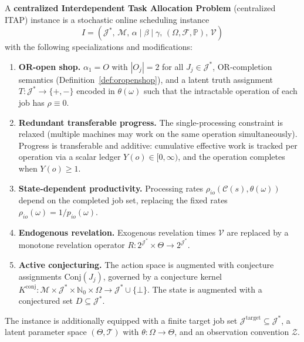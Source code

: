 \begin{definition}\label{def:citap}
A \textbf{centralized Interdependent Task Allocation Problem} (centralized ITAP)
instance is a stochastic online scheduling instance
\[
I = (\mathcal{J}^*,\, \mathcal{M},\, \alpha \mid \beta \mid \gamma,\,
(\Omega, \mathcal{F}, \mathbb{P}),\, \mathcal{V})
\]
with the following specializations and modifications:

\begin{enumerate}
    \item \textbf{OR-open shop.} $\alpha_1 = O$ with $|O_j| = 2$ for all
    $J_j \in \mathcal{J}^*$, OR-completion semantics
    (Definition~\ref{def:oropenshop}), and a latent truth assignment
    $T : \mathcal{J}^* \to \{+,-\}$ encoded in $\theta(\omega)$ such that the
    intractable operation of each job has $\rho \equiv 0$.

    \item \textbf{Redundant transferable progress.} The single-processing
    constraint is relaxed (multiple machines may work on the same operation
    simultaneously). Progress is transferable and additive: cumulative effective
    work is tracked per operation via a scalar ledger $Y(o) \in [0,\infty)$, and
    the operation completes when $Y(o) \ge 1$.

    \item \textbf{State-dependent productivity.} Processing rates
    $\rho_{io}(\mathcal{C}(s), \theta(\omega))$ depend on the completed job set,
    replacing the fixed rates $\rho_{io}(\omega) = 1/p_{io}(\omega)$.

    \item \textbf{Endogenous revelation.} Exogenous revelation times $\mathcal{V}$
    are replaced by a monotone revelation operator
    $R : 2^{\mathcal{J}^*} \times \Theta \to 2^{\mathcal{J}^*}$.

    \item \textbf{Active conjecturing.} The action space is augmented with
    conjecture assignments $\mathrm{Conj}(J_j)$, governed by a conjecture kernel
    $K^{\mathrm{conj}} : \mathcal{M} \times \mathcal{J}^* \times \mathbb{N}_0
    \times \Omega \to \mathcal{J}^* \cup \{\bot\}$. The state is augmented with a
    conjectured set $D \subseteq \mathcal{J}^*$.
\end{enumerate}

The instance is additionally equipped with a finite target job set
$\mathcal{J}^{\mathrm{target}} \subseteq \mathcal{J}^*$, a latent parameter space
$(\Theta, \mathcal{T})$ with $\theta : \Omega \to \Theta$, and an observation
convention $\mathcal{Z}$.
\end{definition}


